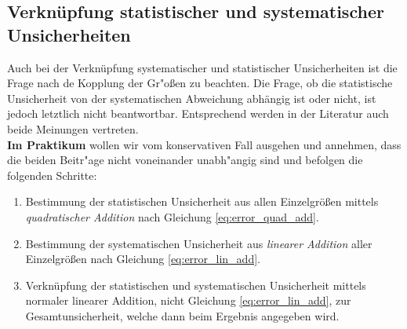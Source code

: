 \subsection{Verknüpfung statistischer und systematischer Unsicherheiten}

Auch bei der Verknüpfung systematischer und statistischer Unsicherheiten ist die Frage nach de Kopplung der Gr"o{\ss}en zu beachten. Die Frage, ob die statistische Unsicherheit von der systematischen Abweichung abhängig ist oder nicht, ist jedoch letztlich nicht beantwortbar. Entsprechend werden in der Literatur auch beide Meinungen vertreten.\\

\noindent
\textbf{Im Praktikum} wollen wir vom konservativen Fall ausgehen und annehmen, dass die beiden Beitr"age nicht voneinander unabh"angig sind und befolgen die folgenden Schritte:
\begin{enumerate}
	\item Bestimmung der statistischen Unsicherheit aus allen Einzelgrößen mittels \textit{quadratischer Addition} nach Gleichung \ref{eq:error_quad_add}.
	\item Bestimmung der systematischen Unsicherheit aus \textit{linearer Addition} aller Einzelgrößen nach Gleichung \ref{eq:error_lin_add}.
	\item Verknüpfung der statistischen und systematischen Unsicherheit mittels normaler linearer Addition, nicht Gleichung \ref{eq:error_lin_add}, zur Gesamtunsicherheit, welche dann beim Ergebnis angegeben wird.
\end{enumerate}

%
